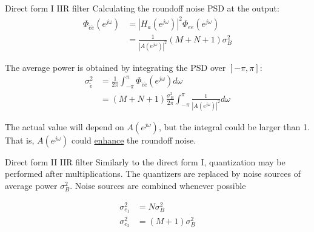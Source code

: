 \documentclass[10pt, handout]{beamer}
\begin{document}
\begin{frame}{Direct form I IIR filter}
	Calculating the roundoff noise PSD at the output:
	\begin{align*}
	\Phi_{\tilde{e}\tilde{e}}(e^{j\omega}) &= |H_a(e^{j\omega})|^2\Phi_{ee}(e^{j\omega}) \\
	& = \frac{1}{|A(e^{j\omega})|^2}(M+N+1)\sigma_B^2
	\end{align*}
	
	The average power is obtained by integrating the PSD over $[-\pi, \pi]$:
	\begin{align*}
	\sigma_{\tilde{e}}^2 &=\frac{1}{2\pi}\int_{-\pi}^{\pi}\Phi_{\tilde{e}\tilde{e}}(e^{j\omega})d\omega \\
	&=(M+N+1)\frac{\sigma_B^2}{2\pi}\int_{-\pi}^{\pi} \frac{1}{|A(e^{j\omega})|^2}d\omega
	\end{align*}
	
	The actual value will depend on $A(e^{j\omega})$, but the integral could be larger than 1. That is, $A(e^{j\omega})$ could \underline{enhance} the roundoff noise.
	
\end{frame}

%
\begin{frame}{Direct form II IIR filter}
 Similarly to the direct form I, quantization may be performed after multiplications. The quantizers are replaced by noise sources of average power $\sigma_B^2$. Noise sources are combined whenever possible
 
\begin{align*}
\sigma_{e_1}^2 &= N\sigma_B^2 \tag{average power of $e_1[n]$} \\
\sigma_{e_2}^2 &= (M+1)\sigma_B^2 \tag{average power of $e_2[n]$} \\
\end{align*}
 
\begin{center}
	\resizebox{0.7\textwidth}{!}{}
\end{center}

\end{frame}
\end{document}
